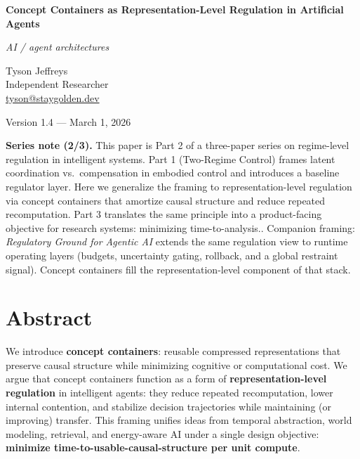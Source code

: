 \documentclass[11pt]{article}
\begin{document}
\begin{titlepage}
\thispagestyle{empty}
\raggedright

\vspace*{0.62\textheight}

{\Large\bfseries Concept Containers as Representation-Level Regulation in Artificial Agents\par}
\vspace{0.4em}
{\large\itshape AI / agent architectures\par}

\vspace{1.6em}

Tyson Jeffreys\\
Independent Researcher\\
\href{mailto:tyson@staygolden.dev}{tyson@staygolden.dev}

\vspace{1.6em}

Version 1.4 --- March 1, 2026

\end{titlepage}


\noindent\textbf{Series note (2/3).} This paper is Part 2 of a three-paper series on regime-level regulation in intelligent systems. Part 1 (Two-Regime Control) frames latent coordination vs.\ compensation in embodied control and introduces a baseline regulator layer. Here we generalize the framing to representation-level regulation via concept containers that amortize causal structure and reduce repeated recomputation. Part 3 translates the same principle into a product-facing objective for research systems: minimizing time-to-analysis.. Companion framing: \emph{Regulatory Ground for Agentic AI} extends the same regulation view to runtime operating layers (budgets, uncertainty gating, rollback, and a global restraint signal). Concept containers fill the representation-level component of that stack.\par\medskip




\section*{Abstract}
We introduce \textbf{concept containers}: reusable compressed representations that preserve causal structure while minimizing cognitive or computational cost. We argue that concept containers function as a form of \textbf{representation-level regulation} in intelligent agents: they reduce repeated recomputation, lower internal contention, and stabilize decision trajectories while maintaining (or improving) transfer. This framing unifies ideas from temporal abstraction, world modeling, retrieval, and energy-aware AI under a single design objective: \textbf{minimize time-to-usable-causal-structure per unit compute}.
\end{document}
